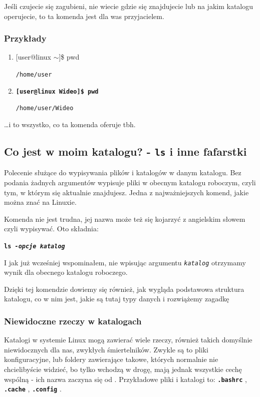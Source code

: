 \documentclass[12pt]{article}
\makeatletter
\newcommand{\ttbf}[1]{
    \texttt{\textbf{#1}}
}
\newenvironment{console1}
{
    \ttfamily
    \fontseries{b}
    \selectfont
    {[}user@linux $\sim${]}\$} {

    }
\makeatother
\begin{document}
Jeśli czujecie się zagubieni, nie wiecie gdzie się znajdujecie lub na jakim katalogu operujecie, to ta komenda jest dla was przyjacielem.

\subsubsection{Przykłady}

\begin{enumerate}
    \item \begin{console1}
        pwd
    \end{console1}
    
    \texttt{/home/user}

    \item \ttbf{[user@linux Wideo]\$ pwd}

    \texttt{/home/user/Wideo}
\end{enumerate}

\dots i to wszystko, co ta komenda oferuje tbh.

\subsection{Co jest w moim katalogu? - \texttt{ls} i inne fafarstki}
\label{sec:ls}

Polecenie służące do wypisywania plików i katalogów w danym katalogu. Bez podania żadnych argumentów wypisuje pliki w obecnym katalogu roboczym, czyli tym, w którym się aktualnie znajdujesz. Jedna z najważniejszych komend, jakie można znać na Linuxie.

Komenda nie jest trudna, jej nazwa może też się kojarzyć z angielskim słowem  czyli wypisywać. Oto składnia:

\ttbf{ls \emph{-opcje} \emph{katalog}}

I jak już wcześniej wspominałem, nie wpisując argumentu \texttt{\emph{katalog}} otrzymamy wynik dla obecnego katalogu roboczego.

Dzięki tej komendzie dowiemy się również, jak wygląda podstawowa struktura katalogu, co w nim jest, jakie są tutaj typy danych i rozwiążemy zagadkę 

\subsubsection{Niewidoczne rzeczy w katalogach}

Katalogi w systemie Linux mogą zawierać wiele rzeczy, również takich domyślnie niewidocznych dla nas, zwykłych śmiertelników. Zwykle są to pliki konfiguracyjne, lub foldery zawierające takowe, których normalnie nie chcielibyście widzieć, bo tylko wchodzą w drogę, mają jednak wszystkie cechę wspólną - ich nazwa zaczyna się od \say{\ttbf{.}}. Przykładowe pliki i katalogi to: \ttbf{.bashrc}, \ttbf{.cache}, \ttbf{.config}.
\end{document}
